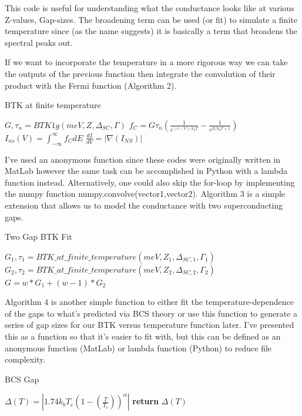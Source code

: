 This code is useful for understanding what the conductance looks like at various Z-values, Gap-sizes. The broadening term can be used (or fit) to simulate a finite temperature since (as the name suggests) it is basically a term that broadens the spectral peaks out.\par
If we want to incorporate the temperature in a more rigorous way we can take the outputs of the previous function then integrate the convolution of their product with the Fermi function (Algorithm 2).
\begin{algorithm}
\caption{BTK at finite temperature}
\begin{algorithmic}[1]
\State $G, \tau_{n} = BTK1g(meV, Z, \Delta_{SC}, \Gamma)$
\State $f_{C} = G\tau_{n}\left(\frac{1}{e^{\left(e-V\right)/k_{b}T}}-\frac{1}{e^{E/k_{b}T+1}}\right)$
\State $I_{ns}(V) = \int_{-\infty}^{\infty}f_{C}dE$
\EndFor
\State $\frac{dI}{dV} = \left|\nabla(I_{NS})\right|$
\end{algorithmic}
\end{algorithm}
I've used an anonymous function since these codes were originally written in MatLab however the same task can be accomplished in Python with a lambda function instead. Alternatively, one could also skip the for-loop by implementing the numpy function numpy.convolve(vector1,vector2). Algorithm 3 is a simple extension that allows us to model the conductance with two superconducting gaps.\par
\begin{algorithm}
\caption{Two Gap BTK Fit}
\begin{algorithmic}[1]
\State $G_{1},\tau_{1} = BTK\_at\_finite\_temperature(meV,Z_{1},\Delta_{SC,1},\Gamma_{1})$
\State $G_{2},\tau_{2} = BTK\_at\_finite\_temperature(meV,Z_{2},\Delta_{SC,2},\Gamma_{2})$
\State $G = w*G_{1} + (w-1)*G_{2}$
\end{algorithmic}
\end{algorithm}
Algorithm 4 is another simple function to either fit the temperature-dependence of the gaps to what's predicted via \ac{BCS} theory or use this function to generate a series of gap sizes for our \ac{BTK} versus temperature function later. I've presented this as a function so that it's easier to fit with, but this can be defined as an anonymous function (MatLab) or lambda function (Python) to reduce file complexity. 
\begin{algorithm}
\caption{BCS Gap}\label{euclid}
\begin{algorithmic}[1]
\State $\Delta(T) = \left|1.74k_{b}T_{c}\left(1-\left(\frac{T}{T_{c}}\right)\right)^{\alpha}\right|$
\State \textbf{return} $\Delta(T)$
\EndFunction
\end{algorithmic}
\end{algorithm}
